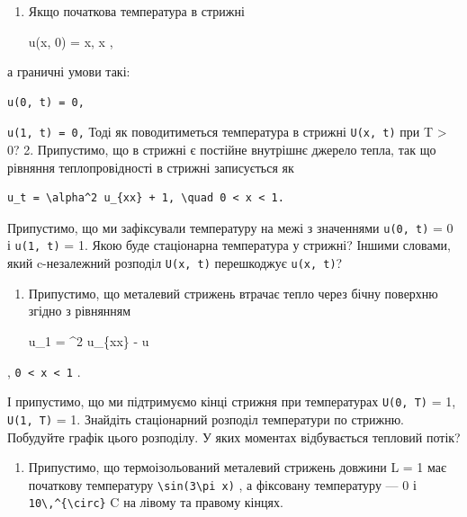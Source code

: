 \documentclass[
  ukrainian,
]{article}
\providecommand{\tightlist}{%
  \setlength{\itemsep}{0pt}\setlength{\parskip}{0pt}}
\begin{document}
\begin{enumerate}
\def\labelenumi{\arabic{enumi}.}
\item
  Якщо початкова температура в стрижні

  u(x, 0) = \sin \pi x,  \leqslant x ,
\end{enumerate}

а граничні умови такі:

\begin{verbatim}
u(0, t) = 0,
\end{verbatim}

\texttt{u(1,\ t)\ =\ 0,} Тоді як поводитиметься температура в стрижні
\texttt{U(x,\ t)} при T \textgreater{} 0? 2. Припустимо, що в стрижні є
постійне внутрішнє джерело тепла, так що рівняння теплопровідності в
стрижні записується як

\begin{verbatim}
u_t = \alpha^2 u_{xx} + 1, \quad 0 < x < 1.
\end{verbatim}

Припустимо, що ми зафіксували температуру на межі з значеннями
\texttt{u(0,\ t)} = 0 і \texttt{u(1,\ t)} = 1. Якою буде стаціонарна
температура у стрижні? Іншими словами, який c-незалежний розподіл
\texttt{U(x,\ t)} перешкоджує \texttt{u(x,\ t)}?

\begin{enumerate}
\def\labelenumi{\arabic{enumi}.}
\setcounter{enumi}{2}
\item
  Припустимо, що металевий стрижень втрачає тепло через бічну поверхню
  згідно з рівнянням

  u\_1 = \alpha\^{}2 u\_\{xx\} - \beta u
\end{enumerate}

, \texttt{0\ \textless{}\ x\ \textless{}\ 1} .

І припустимо, що ми підтримуємо кінці стрижня при температурах
\texttt{U(0,\ T)} = 1, \texttt{U(1,\ T)} = 1. Знайдіть стаціонарний
розподіл температури по стрижню. Побудуйте графік цього розподілу. У
яких моментах відбувається тепловий потік?

\begin{enumerate}
\def\labelenumi{\arabic{enumi}.}
\setcounter{enumi}{3}
\tightlist
\item
  Припустимо, що термоізольований металевий стрижень довжини L = 1 має
  початкову температуру
  \texttt{\textbackslash{}sin(3\textbackslash{}pi\ x)} , а фіксовану
  температуру --- 0 і
  \texttt{10\textbackslash{},\^{}\{\textbackslash{}circ\}} C на лівому
  та правому кінцях.
\end{enumerate}
\end{document}
